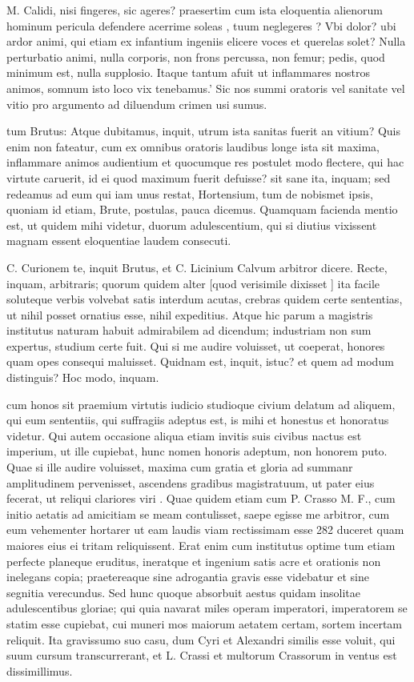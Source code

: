  M. Calidi, nisi fingeres, sic ageres? praesertim cum ista eloquentia alienorum hominum pericula defendere acerrime soleas , tuum neglegeres ? Vbi dolor? ubi ardor animi, qui etiam ex infantium ingeniis elicere voces et querelas solet? Nulla perturbatio animi, nulla corporis, non frons percussa, non femur; pedis, quod minimum est, nulla supplosio. Itaque tantum afuit ut inflammares nostros animos, somnum isto loco vix tenebamus.' Sic nos summi oratoris vel sanitate vel vitio pro argumento ad diluendum crimen usi sumus.

 tum Brutus: Atque dubitamus, inquit, utrum ista sanitas fuerit an vitium? Quis enim non fateatur, cum ex omnibus oratoris laudibus longe ista sit maxima, inflammare animos audientium et quocumque res postulet modo flectere, qui hac virtute caruerit, id ei quod maximum fuerit defuisse? sit sane ita, inquam; sed redeamus ad eum qui iam unus restat, Hortensium, tum de nobismet ipsis, quoniam id etiam, Brute, postulas, pauca dicemus. Quamquam facienda mentio est, ut quidem mihi videtur, duorum adulescentium, qui si diutius vixissent magnam essent eloquentiae laudem consecuti.

 C. Curionem te, inquit Brutus, et C. Licinium Calvum arbitror dicere. Recte, inquam, arbitraris; quorum quidem alter [quod verisimile dixisset ] ita facile soluteque verbis volvebat satis interdum acutas, crebras quidem certe sententias, ut nihil posset ornatius esse, nihil expeditius. Atque hic parum a magistris institutus naturam habuit admirabilem ad dicendum; industriam non sum expertus, studium certe fuit. Qui si me audire voluisset, ut coeperat, honores quam opes consequi maluisset. Quidnam est, inquit, istuc? et quem ad modum distinguis? Hoc modo, inquam.

 cum honos sit praemium virtutis iudicio studioque civium delatum ad aliquem, qui eum sententiis, qui suffragiis adeptus est, is mihi et honestus et honoratus videtur. Qui autem occasione aliqua etiam invitis suis civibus nactus est imperium, ut ille cupiebat, hunc nomen honoris adeptum, non honorem puto. Quae si ille audire voluisset, maxima cum gratia et gloria ad summanr amplitudinem pervenisset, ascendens gradibus magistratuum, ut pater eius fecerat, ut reliqui clariores viri . Quae quidem etiam cum P. Crasso M. F., cum initio aetatis ad amicitiam se meam contulisset, saepe egisse me arbitror, cum eum vehementer hortarer ut eam laudis viam rectissimam esse 282 duceret quam maiores eius ei tritam reliquissent. Erat enim cum institutus optime tum etiam perfecte planeque eruditus, ineratque et ingenium satis acre et orationis non inelegans copia; praetereaque sine adrogantia gravis esse videbatur et sine segnitia verecundus. Sed hunc quoque absorbuit aestus quidam insolitae adulescentibus gloriae; qui quia navarat miles operam imperatori, imperatorem se statim esse cupiebat, cui muneri mos maiorum aetatem certam, sortem incertam reliquit. Ita gravissumo suo casu, dum Cyri et Alexandri similis esse voluit, qui suum cursum transcurrerant, et L. Crassi et multorum Crassorum in ventus est dissimillimus.


